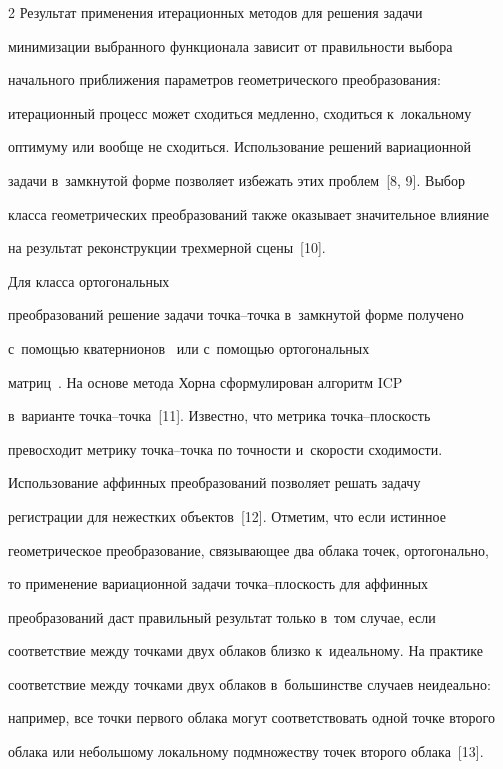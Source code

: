 \begin{multicols}{2}
Результат применения итерационных методов для решения задачи 

минимизации выбранного функционала зависит от правильности выбора 

начального приближения па\-ра\-мет\-ров гео\-мет\-ри\-че\-ско\-го преобразования: 

итерационный процесс может сходиться медленно, сходиться к~локальному 

оптимуму или вообще не сходиться. Использование решений вариационной 

задачи в~замк\-ну\-той форме позволяет избежать этих проблем~[8, 9]. Выбор 

класса гео\-мет\-ри\-че\-ских преобразований так\-же оказывает значительное влияние 

на результат реконструкции трехмерной сцены~[10].



 Для класса ортогональных 

преобразований решение задачи точ\-ка--точ\-ка в~замк\-ну\-той форме получено 

с~по\-мощью кватернионов~\cite{8-voh} или с~помощью ортогональных 

мат\-риц~\cite{9-voh}. На основе метода Хорна сформулирован алгоритм ICP 

в~варианте точ\-ка--точ\-ка~[11]. Известно, что метрика точ\-ка--плос\-кость 

превосходит метрику точ\-ка--точ\-ка по точ\-ности и~ско\-рости схо\-ди\-мости. 



Использование аффинных преобразований позво\-ля\-ет решать задачу 

регистрации для нежестких объектов~[12]. Отметим, что если истинное 

гео\-мет\-ри\-че\-ское преобразование, связывающее два облака точек, ортогонально, 

то применение вариационной задачи точ\-ка--плос\-кость для аффинных 

преобразований даст правильный результат только в~том случае, если 

соответствие между точками двух облаков близко к~идеальному. На практике 

соответствие между точками двух облаков в~большинстве случаев неидеально: 

например, все точки первого облака могут соответствовать одной точке второго 

облака или небольшому локальному подмножеству точек второго облака~[13]. 


\end{multicols}
